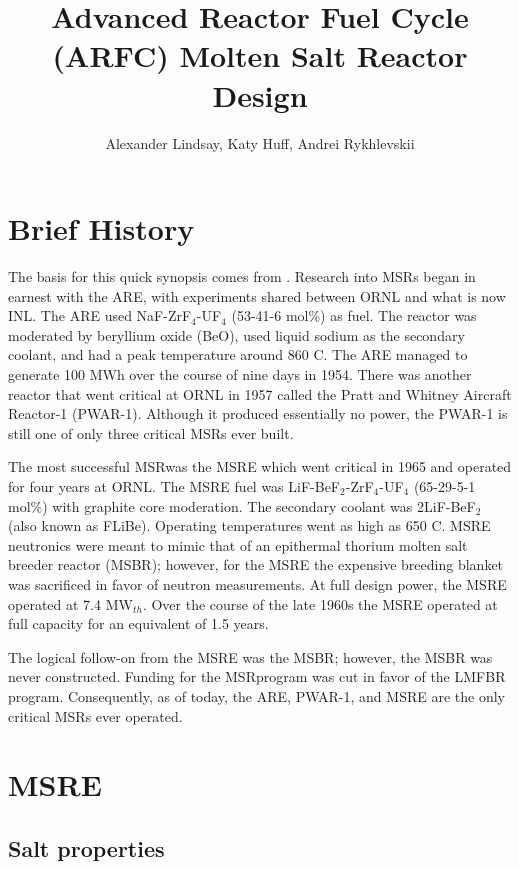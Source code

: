 \documentclass{article}
\title{Advanced Reactor Fuel Cycle (ARFC) Molten Salt Reactor Design}
\author{Alexander Lindsay, Katy Huff, Andrei Rykhlevskii} %
\let\Oldsection\section
\renewcommand{\section}{\FloatBarrier\Oldsection}
\let\Oldsubsection\subsection
\renewcommand{\subsection}{\FloatBarrier\Oldsubsection}
\begin{document}
\maketitle

\section{Brief History}

The basis for this quick synopsis comes from \cite{wiki:Molten_salt_reactor}. 
Research into \glspl{MSR} began in earnest with the \gls{ARE}, with experiments 
shared between \gls{ORNL} and what is now \gls{INL}. The \gls{ARE} used 
NaF-ZrF$_4$-UF$_4$ (53-41-6 mol\%) as fuel. The reactor was moderated by 
beryllium oxide (BeO), used liquid sodium as the secondary coolant, and had a 
peak temperature around 860 \textdegree C. The \gls{ARE} managed to generate
100 MWh over the course of nine days in 1954. There was another reactor that
went critical at \gls{ORNL} in 1957 called the Pratt and Whitney Aircraft Reactor-1
(PWAR-1). Although it produced essentially no power, the PWAR-1 is still one of
only three critical MSRs ever built.

The most successful \gls{MSR}was the \gls{MSRE} which went
critical in 1965 and operated for four years at \gls{ORNL}. The \gls{MSRE} fuel was
LiF-BeF$_2$-ZrF$_4$-UF$_4$ (65-29-5-1 mol\%) with graphite core moderation. The
secondary coolant was 2LiF-BeF$_2$ (also known as FLiBe). Operating temperatures
went as high as 650 \textdegree C. \gls{MSRE} neutronics were meant to mimic that of
an epithermal thorium molten salt breeder reactor (MSBR); however, for the \gls{MSRE}
the expensive breeding blanket was sacrificed in favor of neutron
measurements. At full design power, the \gls{MSRE} operated at 7.4 MW$_{th}$. Over the
course of the late 1960s the \gls{MSRE} operated at full capacity for an equivalent of
1.5 years.

The logical follow-on from the \gls{MSRE} was the MSBR; however, the MSBR was never
constructed. Funding for the \gls{MSR}program was cut in favor of the
\gls{LMFBR} program. Consequently, as of today, the \gls{ARE},
PWAR-1, and \gls{MSRE} are the only critical MSRs ever operated.

\section{\gls{MSRE}}

\subsection{Salt properties}
\end{document}

